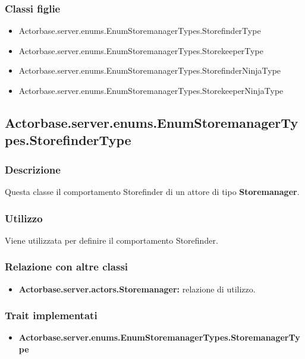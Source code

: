 \documentclass[a4paper]{article}
\begin{document}
			\subsubsection{Classi figlie}
				\begin{itemize}
					\item Actorbase.server.enums.EnumStoremanagerTypes.StorefinderType
					\item Actorbase.server.enums.EnumStoremanagerTypes.StorekeeperType
					\item Actorbase.server.enums.EnumStoremanagerTypes.StorefinderNinjaType
					\item Actorbase.server.enums.EnumStoremanagerTypes.StorekeeperNinjaType
				\end{itemize}				
						

		
		\subsection{Actorbase.server.enums.EnumStoremanagerTypes.StorefinderType}
			\subsubsection{Descrizione}
				Questa classe il comportamento Storefinder di un attore di tipo \textbf{Storemanager}.
				
			\subsubsection{Utilizzo}
				Viene utilizzata per definire il comportamento Storefinder.
				
			\subsubsection{Relazione con altre classi}
				\begin{itemize}
					\item \textbf{Actorbase.server.actors.Storemanager:} relazione di utilizzo.
				\end{itemize}
		
			\subsubsection{Trait implementati}
				\begin{itemize}
					\item \textbf{Actorbase.server.enums.EnumStoremanagerTypes.StoremanagerType} 
				\end{itemize}
				
\end{document}
